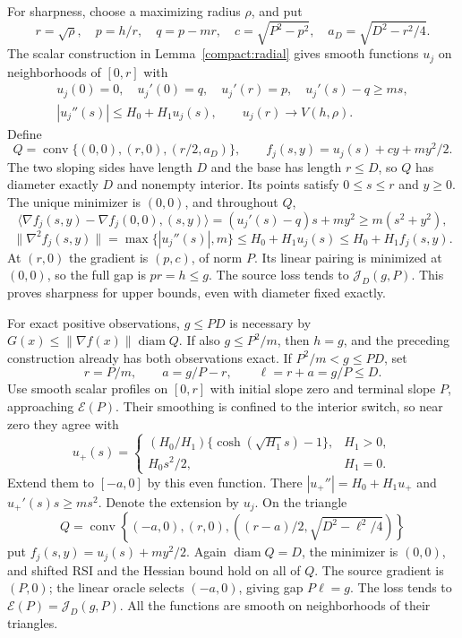 For sharpness, choose a maximizing radius $\rho$, and put
\[
 r=\sqrt\rho,\quad p=h/r,\quad q=p-mr,\quad
 c=\sqrt{P^2-p^2},\quad a_D=\sqrt{D^2-r^2/4}.
\]
The scalar construction in Lemma~\ref{compact:radial} gives
smooth functions $u_j$ on neighborhoods of $[0,r]$ with
\[
 \begin{gathered}
 u_j(0)=0,\quad u_j'(0)=q,\quad u_j'(r)=p,\quad
 u_j'(s)-q\ge ms,\\
 |u_j''(s)|\le H_0+H_1u_j(s),\qquad
 u_j(r)\longrightarrow V(h,\rho).
 \end{gathered}
\]
Define
\[
 Q=\operatorname{conv}\{(0,0),(r,0),(r/2,a_D)\},\qquad
 f_j(s,y)=u_j(s)+cy+my^2/2.
\]
The two sloping sides have length $D$ and the base has length
$r\le D$, so $Q$ has diameter exactly $D$ and nonempty interior.
Its points satisfy $0\le s\le r$ and $y\ge0$. The unique minimizer
is $(0,0)$, and throughout $Q$,
\[
 \langle\nabla f_j(s,y)-\nabla f_j(0,0),(s,y)\rangle
       =(u_j'(s)-q)s+my^2\ge m(s^2+y^2),
\]
\[
 \|\nabla^2f_j(s,y)\|
       =\max\{|u_j''(s)|,m\}
       \le H_0+H_1u_j(s)\le H_0+H_1f_j(s,y).
\]
At $(r,0)$ the gradient is $(p,c)$, of norm $P$. Its linear
pairing is minimized at $(0,0)$, so the full gap is $pr=h\le g$.
The source loss tends to $\mathcal J_D(g,P)$. This proves sharpness
for upper bounds, even with diameter fixed exactly.

For exact positive observations, $g\le PD$ is necessary by
$G(x)\le\|\nabla f(x)\|\operatorname{diam}Q$. If also
$g\le P^2/m$, then $h=g$, and the preceding construction already
has both observations exact. If $P^2/m<g\le PD$, set
\[
 r=P/m,\qquad a=g/P-r,\qquad \ell=r+a=g/P\le D.
\]
Use smooth scalar profiles on $[0,r]$ with initial slope zero
and terminal slope $P$, approaching $\mathcal E(P)$. Their
smoothing is confined to the interior switch, so near zero
they agree with
\[
 u_+(s)=
 \begin{cases}
 (H_0/H_1)\{\cosh(\sqrt{H_1}s)-1\},&H_1>0,\\
 H_0s^2/2,&H_1=0.
 \end{cases}
\]
Extend them to $[-a,0]$ by this even function. There
$|u_+''|=H_0+H_1u_+$ and $u_+'(s)s\ge ms^2$.
Denote the extension by $u_j$.
On the triangle
\[
 Q=\operatorname{conv}\left\{(-a,0),(r,0),
       \left((r-a)/2,\sqrt{D^2-\ell^2/4}\right)\right\}
\]
put $f_j(s,y)=u_j(s)+my^2/2$. Again $\operatorname{diam}Q=D$,
the minimizer is $(0,0)$, and shifted RSI and the Hessian bound
hold on all of $Q$. The source gradient is $(P,0)$; the linear
oracle selects $(-a,0)$, giving gap $P\ell=g$. The loss tends
to $\mathcal E(P)=\mathcal J_D(g,P)$. All the functions are
smooth on neighborhoods of their triangles.

